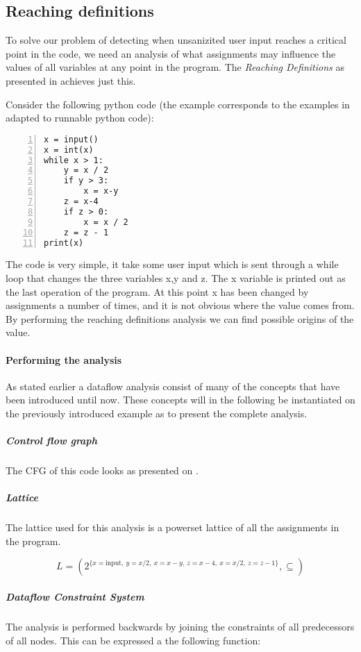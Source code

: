 \subsection{Reaching definitions}
To solve our problem of detecting when unsanizited user input reaches a critical point in the code, we need an analysis of what assignments may influence the values of all variables at any point in the program.
The \emph{Reaching Definitions} as presented in \citet[p.~26]{schwartzbach} achieves just this.

Consider the following python code (the example corresponds to the examples in \citet{schwartzbach} adapted to runnable python code):
\begin{lstlisting}[numbers=left, frame=single, linewidth=6cm]
x = input()
x = int(x)
while x > 1:
    y = x / 2
    if y > 3:
        x = x-y
    z = x-4
    if z > 0:
        x = x / 2
    z = z - 1
print(x)
\end{lstlisting}

The code is very simple, it take some user input which is sent through a while loop that changes the three variables x,y and z.
The x variable is printed out as the last operation of the program.
At this point x has been changed by assignments a number of times, and it is not obvious where the value comes from.
By performing the reaching definitions analysis we can find possible origins of the value.

\paragraph{Performing the analysis}
As stated earlier a dataflow analysis consist of many of the concepts that have been introduced until now.
These concepts will in the following be instantiated on the previously introduced example as to present the complete analysis.

\subparagraph{Control flow graph}
The CFG of this code looks as presented on .

\subparagraph{Lattice}
The lattice used for this analysis is a powerset lattice of all the assignments in the program.

\[ L = ( 2^{ \{x = \text{input}, ~ y = x/2, ~ x = x-y, ~ z=x-4, ~ x = x/2, ~ z = z-1 \} } , \subseteq ) \]


\subparagraph{Dataflow Constraint System}
The analysis is performed backwards by joining the constraints of all predecessors of all nodes.
This can be expressed a the following function:


